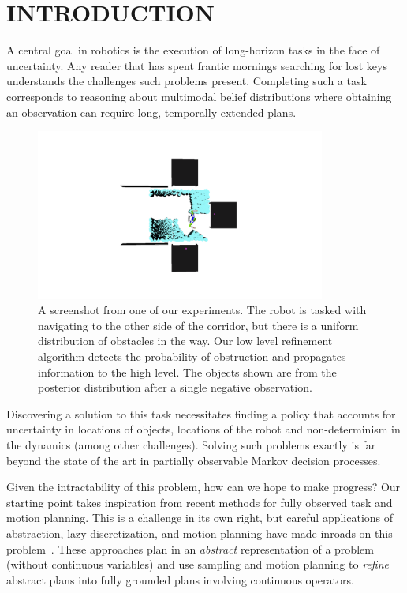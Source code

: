 \section{INTRODUCTION}
A central goal in robotics is the execution of long-horizon tasks in
the face of uncertainty. Any reader that has spent frantic mornings
searching for lost keys understands the challenges such problems
present. Completing such a task corresponds to reasoning about
multimodal belief distributions where obtaining an observation
can require long, temporally extended plans. 
\begin{figure}[h]
  \centering
    \noindent
    \includegraphics[trim = 160mm 90mm 0mm 90mm, clip, width=0.85\textwidth]{corridor_images/corridor_path_2.png}
  \caption{A screenshot from one of our experiments. The robot is
    tasked with navigating to the other side of the corridor, but
    there is a uniform distribution of obstacles in the way. Our low
    level refinement algorithm detects the probability of obstruction and
    propagates information to the high level. The objects shown are
    from the posterior distribution after a single negative
    observation.}
  \label{fig:knot_steps}
\end{figure}


Discovering a solution to this task necessitates finding a policy that
accounts for uncertainty in locations of objects, locations of the
robot and non-determinism in the dynamics (among other
challenges). Solving such problems exactly is far beyond the state of
the art in partially observable Markov decision processes.

Given the intractability of this problem, how can we hope to make
progress? Our starting point takes inspiration from recent methods for
fully observed task and motion planning.  This is a challenge in its
own right, but careful applications of abstraction, lazy
discretization, and motion planning have made inroads on this
problem~\cite{srivastava2014combined, lozano2014constraint}. These
approaches plan in an \emph{abstract} representation of a problem
(without continuous variables) and use sampling and motion planning to
\emph{refine} abstract plans into fully grounded plans involving continuous
operators.

